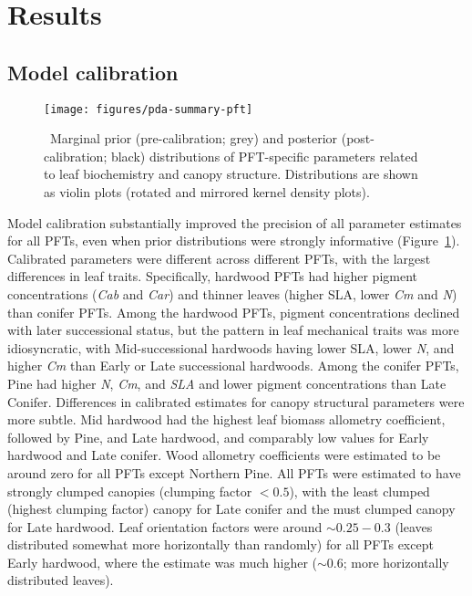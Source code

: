 \section{Results}

\subsection{Model calibration}

\begin{figure}
  \centering
  \texttt{[image: figures/pda-summary-pft]}
  \caption{\
    Marginal prior (pre-calibration; grey) and posterior (post-calibration; black) distributions of PFT-specific parameters
    related to leaf biochemistry and canopy structure.
    Distributions are shown as violin plots (rotated and mirrored kernel density plots).
  }\label{fig:pda_posteriors}
\end{figure}

Model calibration substantially improved the precision of all parameter estimates for all PFTs, even when prior distributions were strongly informative (Figure~\ref{fig:pda_posteriors}).
Calibrated parameters were different across different PFTs, with the largest differences in leaf traits.
Specifically, hardwood PFTs had higher pigment concentrations (\emph{Cab} and \emph{Car}) and thinner leaves (higher SLA, lower \emph{Cm} and \emph{N}) than conifer PFTs.
Among the hardwood PFTs, pigment concentrations declined with later successional status, but the pattern in leaf mechanical traits was more idiosyncratic, with Mid-successional hardwoods having lower SLA, lower \emph{N}, and higher \emph{Cm} than Early or Late successional hardwoods.
Among the conifer PFTs, Pine had higher \emph{N}, \emph{Cm}, and \emph{SLA} and lower pigment concentrations than Late Conifer.
Differences in calibrated estimates for canopy structural parameters were more subtle.
Mid hardwood had the highest leaf biomass allometry coefficient, followed by Pine, and Late hardwood, and comparably low values for Early hardwood and Late conifer.
Wood allometry coefficients were estimated to be around zero for all PFTs except Northern Pine.
All PFTs were estimated to have strongly clumped canopies (clumping factor $< 0.5$), with the least clumped (highest clumping factor) canopy for Late conifer and the must clumped canopy for Late hardwood.
Leaf orientation factors were around $\sim 0.25 - 0.3$ (leaves distributed somewhat more horizontally than randomly) for all PFTs except Early hardwood, where the estimate was much higher ($\sim 0.6$; more horizontally distributed leaves).

